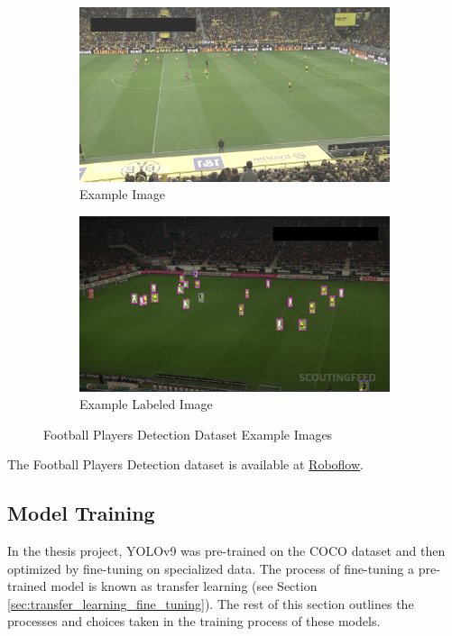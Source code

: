 \begin{figure}[H]
    \centering
    \begin{subfigure}{0.49\textwidth}
        \centering
        \includegraphics[width=\textwidth]{Images/External_datasets/football_1.jpg}
        \caption{\centering Example Image}
    \end{subfigure}
    \hfill
    \begin{subfigure}{0.49\textwidth}
        \centering
        \includegraphics[width=\textwidth]{Images/External_datasets/football_2.png}
        \caption{\centering Example Labeled Image}
    \end{subfigure}
    \caption{\centering Football Players Detection Dataset Example Images}
    \label{fig:football_examples}
\end{figure}

The Football Players Detection dataset is available at \href{https://universe.roboflow.com/roboflow-jvuqo/football-players-detection-3zvbc}{Roboflow}.

\subsection{Model Training}
\label{sec:model_training}
In the thesis project, YOLOv9 was pre-trained on the COCO dataset and then optimized by fine-tuning on specialized data. The process of fine-tuning a pre-trained model is known as transfer learning (see Section \ref{sec:transfer_learning_fine_tuning}). The rest of this section outlines the processes and choices taken in the training process of these models.

